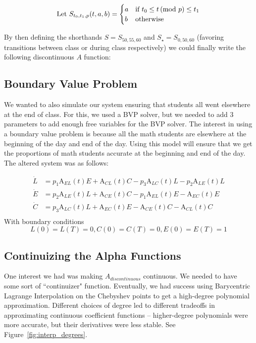 \documentclass[11pt]{amsart}
\newcommand{\A}{{\mathrm{A}}}
\begin{document}
\begin{equation*}
    \text{Let } S_{t_0,t_1,p}(t, a, b) = \begin{cases}a & \text{if } t_0 \le t\mkern-5mu\pmod{p} \le t_1\\ b& \text{otherwise}\end{cases}
\end{equation*}

By then defining the shorthands $S = S_{50, 55, 60}$ and $S_\star = S_{0, 50, 60}$
(favoring transitions between class or during class respectively)
we could finally write the following discontinuous $A$ function:




\subsection{Boundary Value Problem}
We wanted to also simulate our system ensuring that students all went elsewhere at the end of class.
For this, we used a BVP solver, but we needed to add 3 parameters to add enough free variables for the 
BVP solver. The interest in using a boundary value problem is because all the math students are elsewhere at the beginning of the
day and end of the day. Using this model will ensure that we get the proportions of math students accurate at the beginning 
and end of the day. The altered system was as follows:

\begin{equation}
    \begin{aligned}
        \dot{L} &= p_1\A_{EL}(t)E + \A_{CL}(t)C - p_3\A_{LC}(t)L - p_2\A_{LE}(t)L \\
        \dot{E} &= p_2\A_{LE}(t)L + \A_{CE}(t)C - p_1\A_{EL}(t)E - \A_{EC}(t)E \\
        \dot{C} &= p_3\A_{LC}(t)L + \A_{EC}(t)E - \A_{CE}(t)C - \A_{CL}(t)C \\
    \end{aligned}
    \label{eq:bvp}
\end{equation}
With boundary conditions \[L(0)=L(T)=0, C(0)=C(T)=0, E(0)=E(T)=1\]


\subsection{Continuizing the Alpha Functions}
One interest we had was making $A_{discontinuous}$ continuous. We needed to have some sort of ``continuizer" function. Eventually, we had success using Barycentric 
Lagrange Interpolation on the Chebyshev points to get a high-degree polynomial approximation. Different choices of degree led to different tradeoffs in approximating continuous coefficient 
functions -- higher-degree polynomials were more accurate, but their derivatives were less stable. See Figure~\ref{fig:interp_degrees}.
\end{document}
